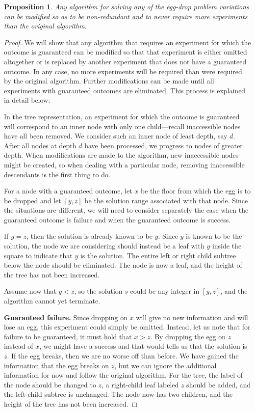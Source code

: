 \documentclass[12pt]{amsart}
\newtheorem{proposition}[theorem]{Proposition}
\theoremstyle{definition}
\theoremstyle{theorem}
\begin{document}
\begin{proposition}\label{normal-non} 
Any algorithm for solving any of the egg-drop  problem variations  can be modified 
so as to be non-redundant and to never require more experiments than the original algorithm. 
\end{proposition}
\begin{proof}
We will show that any algorithm that requires 
an experiment for which the outcome is guaranteed can be modified
so that that experiment is either omitted altogether or is
replaced by another experiment that does not have a 
guaranteed outcome. In any case, no more  experiments will be required
than were required by the original algorithm. Further modifications can be made 
until all experiments with guaranteed outcomes are eliminated.
This process is explained in detail below:

In the tree representation,
an experiment for which the outcome is guaranteed
will correspond to an inner node with only one child---recall
inaccessible nodes have all been removed. We consider such an inner 
node of least depth, say  $d$. After all nodes at depth $d$ have
been processed, we progress to nodes of greater depth.
When modifications are made to the algorithm, new inaccessible nodes
might be created, so when dealing with a particular node, removing
inaccessible descendants  is the first thing to do.

\medskip
For a node with a guaranteed outcome, let $x$ be the floor from which the
egg is to be dropped
and let $[y,z]$ be the solution range associated with that node. 
Since the situations are different, we will need to
consider separately the case when the guaranteed outcome is failure
and when the guaranteed outcome is success.

If $y=z$, then the solution is already known to be $y$. Since $y$ is known 
to be the solution, the node we are considering should instead be a leaf with $y$ inside 
the square to indicate that $y$ is the solution.
The entire left or  right child subtree below 
the node should be eliminated. The node is now a leaf, and the height of the
tree has not been increased.

Assume now that $y<z$, so  the solution $s$ could be any integer in $[y,z]$, 
and the algorithm cannot yet terminate.

\medskip
\noindent
\textbf{Guaranteed failure.}  Since dropping on $x$ will give no new information
and will lose an egg, this experiment could simply be omitted. Instead,
let us note that for failure to be guaranteed, it must hold that $x>z$.
By dropping the egg on $z$ instead of $x$, we might have a success and that
would tells us that the solution is $z$. If the egg breaks, then we are no
worse off than before. We have gained the information that the egg breaks on $z$,
but we can ignore the additional information for now and follow the
original algorithm.
For the tree, the label of the  node should be changed to $z$,
a right-child leaf labeled $z$ should be added, and the left-child 
subtree is unchanged. The node now has two children, and 
the height of the tree has not been increased. 


\end{proof}
\end{document}
